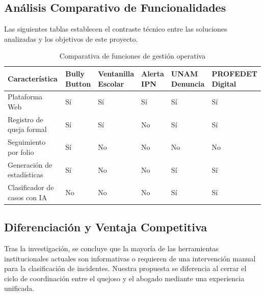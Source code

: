 \documentclass[12pt, letterpaper]{article}
\begin{document}
\subsection {Análisis Comparativo de Funcionalidades}
Las siguientes tablas establecen el contraste técnico entre las soluciones analizadas y los objetivos de este proyecto.
\begin{table}[H]
    \centering
    \caption{Comparativa de funciones de gestión operativa}
    \label{tab:comparativa_funciones}
    \small
    \begin{tabular}{>{\raggedright\arraybackslash}p{3.4cm} >{\centering\arraybackslash}p{1.9cm} >{\centering\arraybackslash}p{1.9cm} >{\centering\arraybackslash}p{1.9cm} >{\centering\arraybackslash}p{1.9cm} >{\centering\arraybackslash}p{1.9cm}}
    \toprule
    \textbf{Característica} &
    \makecell{\textbf{Bully}\\\textbf{Button}} &
    \makecell{\textbf{Ventanilla}\\\textbf{Escolar}} &
    \makecell{\textbf{Alerta}\\\textbf{IPN}} &
    \makecell{\textbf{UNAM}\\\textbf{Denuncia}} &
    \makecell{\textbf{PROFEDET}\\\textbf{Digital}} \\
    \midrule
    Plataforma Web               & Sí & Sí & Sí & Sí & Sí \\
    \addlinespace
    Registro de queja formal     & Sí & Sí & No & Sí & Sí \\
    \addlinespace
    Seguimiento por folio        & Sí & No & No & No & No \\
    \addlinespace
    Generación de estadísticas   & Sí & No & No & Sí & Sí \\
    \addlinespace
    Clasificador de casos con IA & No & No & No & Sí & Sí \\
    \bottomrule
    \end{tabular}
    \end{table}

\subsection {Diferenciación y Ventaja Competitiva}
Tras la investigación, se concluye que la mayoría de las herramientas institucionales actuales son informativas o requieren de una intervención manual para la clasificación de incidentes. Nuestra propuesta se diferencia al cerrar el ciclo de coordinación entre el quejoso y el abogado mediante una experiencia unificada.
\end{document}
